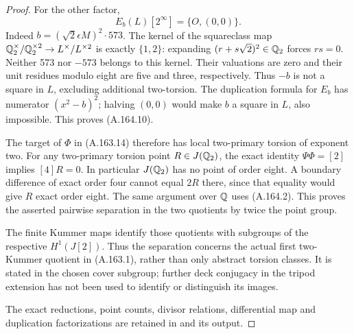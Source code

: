 \begin{proof}
For the other factor,
\[
                          E_b(L)[2^\infty]=\{O,(0,0)\}.
\tag{A.164.10}
\]
Indeed \(b=(\sqrt2\epsilon M)^2\cdot573\).
The kernel of the squareclass map
\(\mathbb Q_2^\times/\mathbb Q_2^{\times2}\to L^\times/L^{\times2}\)
is exactly \(\{1,2\}\): expanding
\((r+s\sqrt2)^2\in\mathbb Q_2\) forces \(rs=0\).
Neither 573 nor \(-573\) belongs to this kernel.
Their valuations are zero and their unit residues
modulo eight are five and three, respectively.
Thus \(-b\) is not a square in \(L\), excluding
additional two-torsion.  The duplication formula
for \(E_b\) has numerator \((x^2-b)^2\);
halving \((0,0)\) would make \(b\) a square
in \(L\), also impossible.  This proves
(A.164.10).

The target of \(\Phi\) in (A.163.14) therefore
has local two-primary torsion of exponent two.
For any two-primary torsion point \(R\in J(\mathbb Q_2)\),
the exact identity \(\Psi\Phi=[2]\) implies
\([4]R=0\).  In particular \(J(\mathbb Q_2)\)
has no point of order eight.  A boundary
difference of exact order four cannot equal
\(2R\) there, since that equality would give
\(R\) exact order eight.  The same argument
over \(\mathbb Q\) uses (A.164.2).  This proves
the asserted pairwise separation in the two
quotients by twice the point group.

The finite Kummer maps identify those quotients
with subgroups of the respective \(H^1(J[2])\).
Thus the separation concerns the actual first
two-Kummer quotient in (A.163.1), rather than
only abstract torsion classes.  It is stated
in the chosen cover subgroup; further deck
conjugacy in the tripod extension has not been
used to identify or distinguish its images.

The exact reductions, point counts, divisor
relations, differential map and duplication
factorizations are retained in
and its output.
\end{proof}
